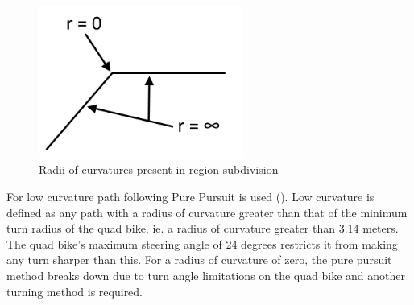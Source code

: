 \documentclass[main.tex]{subfiles}
\begin{document}
\begin{figure}[ht]
\includegraphics[width=0.6\textwidth]{4-DetailedDesign/radiusOfCurvatures.png}
\centering
\caption{Radii of curvatures present in region subdivision} 
\end{figure}
For low curvature path following Pure Pursuit is used (). Low curvature is defined as any path with a radius of curvature greater than that of the minimum turn radius of the quad bike, ie. a radius of curvature greater than 3.14 meters. The quad bike's maximum steering angle of 24 degrees restricts it from making any turn sharper than this. For a radius of curvature of zero, the pure pursuit method breaks down due to turn angle limitations on the quad bike and another turning method is required.
\end{document}
